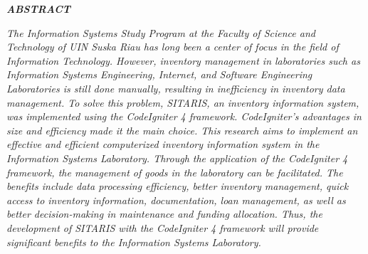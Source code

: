 %


%
\fontsize{12}{14.4}
\begin{center}\MakeUppercase{\textbf{\emph{Abstract}}}\end{center}

\noindent
\fontsize{10pt}{12pt}\selectfont
\emph{The Information Systems Study Program at the Faculty of Science and Technology of UIN Suska Riau has long been a center of focus in the field of Information Technology. However, inventory management in laboratories such as Information Systems Engineering, Internet, and Software Engineering Laboratories is still done manually, resulting in inefficiency in inventory data management. To solve this problem, SITARIS, an inventory information system, was implemented using the CodeIgniter 4 framework. CodeIgniter's advantages in size and efficiency made it the main choice. This research aims to implement an effective and efficient computerized inventory information system in the Information Systems Laboratory. Through the application of the CodeIgniter 4 framework, the management of goods in the laboratory can be facilitated. The benefits include data processing efficiency, better inventory management, quick access to inventory information, documentation, loan management, as well as better decision-making in maintenance and funding allocation. Thus, the development of SITARIS with the CodeIgniter 4 framework will provide significant benefits to the Information Systems Laboratory.}\\
 \\